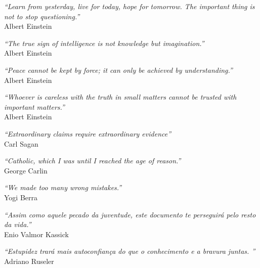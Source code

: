 


\begin{epigrafe}

\vspace*{\fill}\lang
{
    \begin{flushright}
        \textit{``Learn from yesterday, live for today, hope for tomorrow. The important thing is not to stop questioning.''} \\ Albert Einstein
    \end{flushright}
    \begin{flushright}
        \textit{``The true sign of intelligence is not knowledge but imagination.''} \\  Albert Einstein
    \end{flushright}
    \begin{flushright}
        \textit{``Peace cannot be kept by force; it can only be achieved by understanding.''} \\ Albert Einstein
    \end{flushright}
    \begin{flushright}
        \textit{``Whoever is careless with the truth in small matters cannot be trusted with important matters.''} \\ Albert Einstein
    \end{flushright}
    \begin{flushright}
        \textit{``Extraordinary claims require extraordinary evidence''} \\ Carl Sagan
    \end{flushright}
    \begin{flushright}
        \textit{``Catholic, which I was until I reached the age of reason.''} \\ George Carlin
    \end{flushright}
    \begin{flushright}
        \textit{``We made too many wrong mistakes.''} \\ Yogi Berra
    \end{flushright}
}
{
    \begin{flushright}
        \textit{``Assim como aquele pecado da juventude, este documento te perseguirá pelo resto da vida.''} \\ Enio Valmor Kassick
    \end{flushright}
    \begin{flushright}
        \textit{``Estupidez trará mais autoconfiança do que o conhecimento e a bravura juntas. \englishword{\showfont}''} \\ Adriano Ruseler
    \end{flushright}
}

\end{epigrafe}


